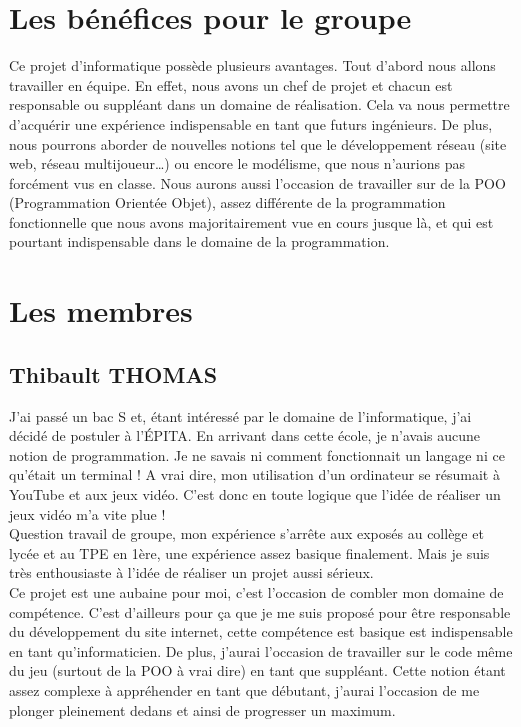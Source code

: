 \documentclass[12pt]{report}
\begin{document}
	\section{Les bénéfices pour le groupe}
		Ce projet d'informatique possède plusieurs avantages. Tout d'abord nous allons travailler en équipe. En effet, nous avons un chef de projet et chacun est responsable ou suppléant dans un domaine de réalisation. Cela va nous permettre d'acquérir une expérience indispensable en tant que futurs ingénieurs. De plus, nous pourrons aborder de nouvelles notions tel que le développement réseau (site web, réseau multijoueur…) ou encore le modélisme, que nous n'aurions pas forcément vus en classe. Nous aurons aussi l'occasion de travailler sur de la POO (Programmation Orientée Objet), assez différente de la programmation fonctionnelle que nous avons majoritairement vue en cours jusque là, et qui est pourtant indispensable dans le domaine de la programmation.

	\section{Les membres}
		\subsection{Thibault THOMAS}
		
J'ai passé un bac S et, étant intéressé par le domaine de l'informatique, j'ai décidé de postuler à l'\'EPITA. En arrivant dans cette école, je n'avais aucune notion de programmation. Je ne savais ni comment fonctionnait un langage ni ce qu'était un terminal !
A vrai dire, mon utilisation d'un ordinateur se résumait à YouTube et aux jeux vidéo. C’est donc en toute logique que l’idée de réaliser un jeux vidéo m’a vite plue ! \\
Question travail de groupe, mon expérience s’arrête aux exposés au collège et lycée et au TPE en 1ère, une expérience assez basique finalement. Mais je suis très enthousiaste à l'idée de réaliser un projet aussi sérieux. \\
		
			 Ce projet est une aubaine pour moi, c'est l'occasion de combler mon domaine de compétence. C'est d'ailleurs pour ça que je me suis proposé pour être responsable du développement du site internet, cette compétence est basique est indispensable en tant qu'informaticien. De plus, j'aurai l'occasion de travailler sur le code même du jeu (surtout de la POO à vrai dire) en tant que suppléant. Cette notion étant assez complexe à appréhender en tant que débutant, j'aurai l'occasion de me plonger pleinement dedans et ainsi de progresser un maximum. 
		
\end{document}
